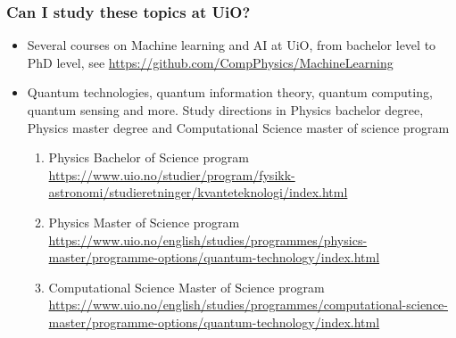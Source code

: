 \documentclass{beamer}
\begin{document}
\begin{frame}
\frametitle{Can I study these topics at UiO?}


\begin{itemize}
\item Several courses on Machine learning and AI at UiO, from bachelor level to PhD level, see \url{https://github.com/CompPhysics/MachineLearning}
\item Quantum technologies, quantum information theory, quantum computing, quantum sensing and more. Study directions in Physics bachelor degree, Physics master degree and Computational Science master of science program
  \begin{enumerate}
  \item Physics Bachelor of Science program  \url{https://www.uio.no/studier/program/fysikk-astronomi/studieretninger/kvanteteknologi/index.html}
  \item Physics Master of Science program \url{https://www.uio.no/english/studies/programmes/physics-master/programme-options/quantum-technology/index.html}
  \item Computational Science Master of Science program \url{https://www.uio.no/english/studies/programmes/computational-science-master/programme-options/quantum-technology/index.html}
    \end{enumerate}
\end{itemize}

\end{frame}
\end{document}
